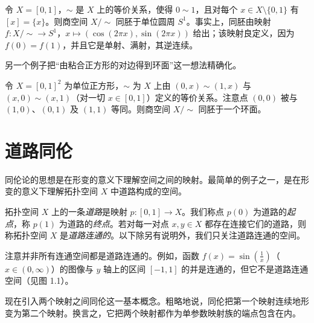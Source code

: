 \begin{example}[1.2]
令 $X=[0,1]$，$\sim$ 是 $X$ 上的等价关系，使得 $0\sim1$，且对每个 $x\in X\setminus\{0,1\}$ 有 $[x]=\{x\}$。则商空间 $X/{\sim}$ 同胚于单位圆周 $S^1$。事实上，同胚由映射 $f\colon X/{\sim}\to S^1$，$x\mapsto(\cos(2\pi x),\sin(2\pi x))$ 给出；该映射良定义，因为 $f(0)=f(1)$，并且它是单射、满射，其逆连续。
\end{example}

另一个例子把“由粘合正方形的对边得到环面”这一想法精确化。

\begin{example}[1.3]
令 $X=[0,1]^2$ 为单位正方形，$\sim$ 为 $X$ 上由 $(0,x)\sim(1,x)$ 与 $(x,0)\sim(x,1)$（对一切 $x\in[0,1]$）定义的等价关系。注意点 $(0,0)$ 被与 $(1,0)$、$(0,1)$ 及 $(1,1)$ 等同。则商空间 $X/{\sim}$ 同胚于一个环面。
\end{example}

\section{道路同伦}

同伦论的思想是在形变的意义下理解空间之间的映射。最简单的例子之一，是在形变的意义下理解拓扑空间 $X$ 中道路构成的空间。

拓扑空间 $X$ 上的一条\emph{道路}是映射 $p\colon[0,1]\to X$。我们称点 $p(0)$ 为道路的\emph{起点}，称 $p(1)$ 为道路的\emph{终点}。若对每一对点 $x,y\in X$ 都存在连接它们的道路，则称拓扑空间 $X$ 是\emph{道路连通的}。以下除另有说明外，我们只关注道路连通的空间。

\begin{example}[1.4]
注意并非所有连通空间都是道路连通的。例如，函数 $f(x)=\sin(\tfrac{1}{x})$（$x\in(0,\infty)$）的图像与 $y$ 轴上的区间 $[-1,1]$ 的并是连通的，但它不是道路连通空间（见图 1.1）。
\end{example}



现在引入两个映射之间同伦这一基本概念。粗略地说，同伦把第一个映射连续地形变为第二个映射。换言之，它把两个映射都作为单参数映射族的端点包含在内。

